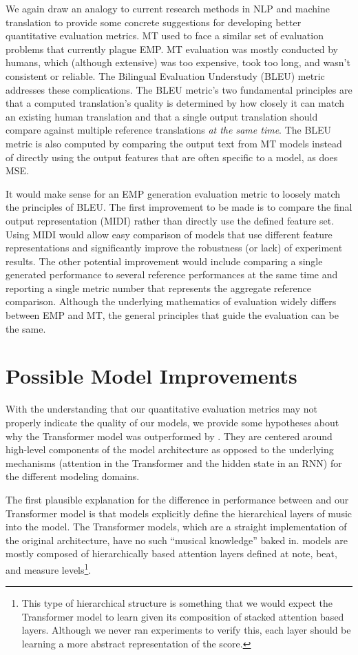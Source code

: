 We again draw an analogy to current research methods in NLP and machine translation to provide some concrete suggestions for developing better quantitative evaluation metrics. MT used to face a similar set of evaluation problems that currently plague EMP. MT evaluation was mostly conducted by humans, which (although extensive) was too expensive, took too long, and wasn't consistent or reliable. The Bilingual Evaluation Understudy (BLEU) metric~\cite{papineni2002bleu} addresses these complications. The BLEU metric's two fundamental principles are that a computed translation's quality is determined by how closely it can match an existing human translation and that a single output translation should compare against multiple reference translations \emph{at the same time}. The BLEU metric is also computed by comparing the output text from MT models instead of directly using the output features that are often specific to a model, as does MSE. 

It would make sense for an EMP generation evaluation metric to loosely match the principles of BLEU. The first improvement to be made is to compare the final output representation (MIDI) rather than directly use the defined feature set. Using MIDI would allow easy comparison of models that use different feature representations and significantly improve the robustness (or lack) of experiment results. The other potential improvement would include comparing a single generated performance to several reference performances at the same time and reporting a single metric number that represents the aggregate reference comparison. Although the underlying mathematics of evaluation widely differs between EMP and MT, the general principles that guide the evaluation can be the same. 

\section{Possible Model Improvements}
With the understanding that our quantitative evaluation metrics may not properly indicate the quality of our models, we provide some hypotheses about why the Transformer model was outperformed by \vnet{}. They are centered around high-level components of the model architecture as opposed to the underlying mechanisms (attention in the Transformer and the hidden state in an RNN) for the different modeling domains. 

The first plausible explanation for the difference in performance between \vnet{} and our Transformer model is that \vnet{} models explicitly define the hierarchical layers of music into the model. The Transformer models, which are a straight implementation of the original architecture, have no such ``musical knowledge'' baked in. \vnet{} models are mostly composed of hierarchically based attention layers defined at note, beat, and measure levels\footnote{This type of hierarchical structure is something that we would expect the Transformer model to learn given its composition of stacked attention based layers. Although we never ran experiments to verify this, each layer should be learning a more abstract representation of the score.}. 

